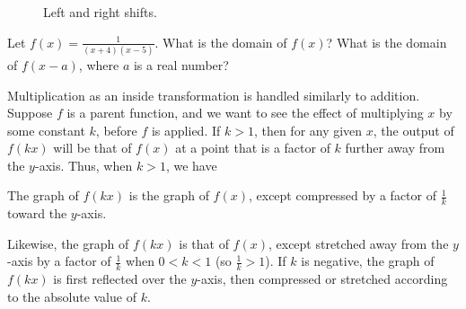 \begin{figure}[h]
\centering
{} 
\caption{Left and right shifts.}
\end{figure}

\par

\begin{question} Let $f(x) = \frac{1}{(x+4)(x-5)}$. What is the domain of $f(x)$? What is the domain of $f(x-a)$, where $a$ is a real number?
\end{question}

\par 

Multiplication as an inside transformation is handled similarly to addition. Suppose $f$ is a parent function, and we want to see the effect of multiplying $x$ by some constant $k$, before $f$ is applied. If $k>1$, then for any given $x$, the output of $f(kx)$ will be that of $f(x)$ at a point that is a factor of $k$ further away from the $y$-axis. Thus, when $k>1$, we have
\\
\begin{center}
The graph of $f(kx)$ is the graph of $f(x)$, except compressed by a factor of $\frac{1}{k}$ toward the $y$-axis.\\
\end{center}
Likewise, the graph of $f(kx)$ is that of $f(x)$, except stretched away from the $y$-axis by a factor of $\frac{1}{k}$ when $0<k<1$ (so $\frac{1}{k} > 1$). If $k$ is negative, the graph of $f(kx)$ is first reflected over the $y$-axis, then compressed or stretched according to the absolute value of $k$.

